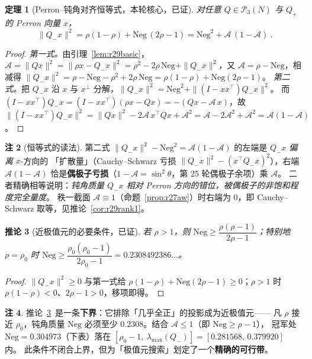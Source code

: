 \documentclass[UTF8,11pt]{ctexart}
\newtheorem{theorem}{定理}[section]
\newtheorem{corollary}[theorem]{推论}
\theoremstyle{definition}
\newtheorem{remark}[theorem]{注}
\begin{document}
\begin{theorem}[Perron--钝角对齐恒等式，本轮核心，已证]\label{thm:r29align}
对任意 $Q\in\mathcal P_3(N)$ 与 $Q_+$ 的 Perron 向量 $x$，
\begin{equation}\label{eq:r29beta}
\boxed{\ \|Q_-x\|^2=\rho(1-\rho)+\mathrm{Neg}\,(2\rho-1)=\mathrm{Neg}^2+\mathcal A\,(1-\mathcal A)\ }.
\end{equation}
\end{theorem}
\begin{proof}
\emph{第一式。}由引理~\ref{lem:r29basic}，$\mathcal A=\|Qx\|^2=\|\rho x-Q_-x\|^2
=\rho^2-2\rho\,\mathrm{Neg}+\|Q_-x\|^2$，又 $\mathcal A=\rho-\mathrm{Neg}$，相减得
$\|Q_-x\|^2=\rho-\mathrm{Neg}-\rho^2+2\rho\,\mathrm{Neg}=\rho(1-\rho)+\mathrm{Neg}(2\rho-1)$。
\emph{第二式。}把 $Q_-x$ 沿 $x$ 与 $x^\perp$ 分解，$\|Q_-x\|^2=\mathrm{Neg}^2+\|(I-xx^\top)Q_-x\|^2$。
而 $(I-xx^\top)Q_-x=(I-xx^\top)(\rho x-Qx)=-(Qx-\mathcal A\,x)$，故
$\|(I-xx^\top)Q_-x\|^2=\|Qx\|^2-2\mathcal A\,x^\top Qx+\mathcal A^2
=\mathcal A-2\mathcal A^2+\mathcal A^2=\mathcal A(1-\mathcal A)$。
\end{proof}

\begin{remark}[恒等式的读法]\label{rem:r29read}
第二式 $\|Q_-x\|^2-\mathrm{Neg}^2=\mathcal A(1-\mathcal A)$ 的左端是 $Q_-x$ \emph{偏离} $x$-方向的
「扩散量」（Cauchy--Schwarz 亏损 $\|Q_-x\|^2-(x^\top Q_-x)^2$），右端 $\mathcal A(1-\mathcal A)$
恰是\textbf{偶极子亏损}（$1-\mathcal A=\sin^2\theta$，第 25 轮偶极子余项）乘 $\mathcal A$。
二者精确相等说明：\emph{钝角质量 $Q_-x$ 相对 Perron 方向的错位，被偶极子的非饱和程度完全量度}。
秩一截面 $\mathcal A\equiv1$（命题~\ref{prop:r27aw}）时右端为 $0$，即 Cauchy--Schwarz 取等，见推论~\ref{cor:r29rank1}。
\end{remark}

\begin{corollary}[近极值元的必要条件，已证]\label{cor:r29nec}
若 $\rho>1$，则 $\mathrm{Neg}\ge\dfrac{\rho(\rho-1)}{2\rho-1}$；特别地 $\rho=\rho_0$ 时
$\mathrm{Neg}\ge\dfrac{\rho_0(\rho_0-1)}{2\rho_0-1}=0.2308492386\ldots$。
\end{corollary}
\begin{proof}
$\|Q_-x\|^2\ge0$ 与第一式给 $\rho(1-\rho)+\mathrm{Neg}(2\rho-1)\ge0$；$\rho>1$ 时 $\rho(1-\rho)<0$、$2\rho-1>0$，移项即得。
\end{proof}
\begin{remark}
推论~\ref{cor:r29nec}~是一条\textbf{下界}：它排除「几乎全正」的投影成为近极值元——
凡 $\rho$ 接近 $\rho_0$，钝角质量 $\mathrm{Neg}$ 必须至少 $0.2308$。结合 $\mathcal A\le1$（即 $\mathrm{Neg}\ge\rho-1$），
冠军处 $\mathrm{Neg}=0.304973$（下表）落在 $[\rho_0-1,\ \lambda_{\max}(Q_-)]= [0.281568,\,0.379920]$ 内。
此条件不闭合上界，但为「极值元搜索」划定了一个\textbf{精确的可行带}。
\end{remark}
\end{document}
